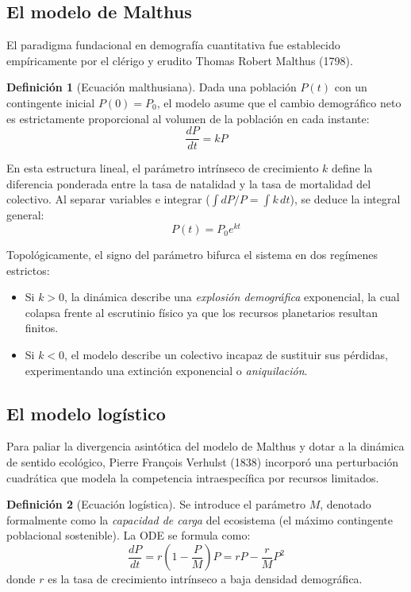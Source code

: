 \documentclass[11pt,a4paper]{article}
\theoremstyle{definition}
\newtheorem{definition}{Definición}[section]
\theoremstyle{plain}
\begin{document}
\subsection{El modelo de Malthus}

El paradigma fundacional en demografía cuantitativa fue establecido empíricamente por el clérigo y erudito Thomas Robert Malthus (1798).

\begin{definition}[Ecuación malthusiana]
Dada una población $P(t)$ con un contingente inicial $P(0) = P_0$, el modelo asume que el cambio demográfico neto es estrictamente proporcional al volumen de la población en cada instante:
\begin{equation}
    \frac{dP}{dt} = kP
\end{equation}
\end{definition}

En esta estructura lineal, el parámetro intrínseco de crecimiento $k$ define la diferencia ponderada entre la tasa de natalidad y la tasa de mortalidad del colectivo. Al separar variables e integrar ($\int dP/P = \int k \,dt$), se deduce la integral general:
\begin{equation}
    P(t) = P_0 e^{kt}
\end{equation}

Topológicamente, el signo del parámetro bifurca el sistema en dos regímenes estrictos:
\begin{itemize}
    \item Si $k > 0$, la dinámica describe una \textit{explosión demográfica} exponencial, la cual colapsa frente al escrutinio físico ya que los recursos planetarios resultan finitos.
    \item Si $k < 0$, el modelo describe un colectivo incapaz de sustituir sus pérdidas, experimentando una extinción exponencial o \textit{aniquilación}.
\end{itemize}

\subsection{El modelo logístico}

Para paliar la divergencia asintótica del modelo de Malthus y dotar a la dinámica de sentido ecológico, Pierre François Verhulst (1838) incorporó una perturbación cuadrática que modela la competencia intraespecífica por recursos limitados.

\begin{definition}[Ecuación logística]
Se introduce el parámetro $M$, denotado formalmente como la \textit{capacidad de carga} del ecosistema (el máximo contingente poblacional sostenible). La ODE se formula como:
\begin{equation}
    \frac{dP}{dt} = r \left( 1 - \frac{P}{M} \right) P = rP - \frac{r}{M}P^2
\end{equation}
donde $r$ es la tasa de crecimiento intrínseco a baja densidad demográfica.
\end{definition}
\end{document}
